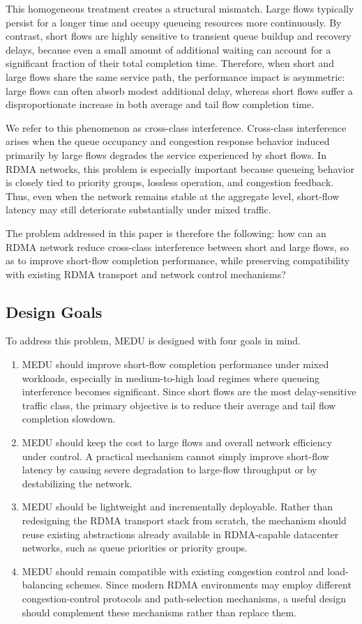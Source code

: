 \documentclass[conference]{IEEEtran}
\begin{document}
This homogeneous treatment creates a structural mismatch. Large flows typically persist for a longer time and occupy queueing resources more continuously. By contrast, short flows are highly sensitive to transient queue buildup and recovery delays, because even a small amount of additional waiting can account for a significant fraction of their total completion time. Therefore, when short and large flows share the same service path, the performance impact is asymmetric: large flows can often absorb modest additional delay, whereas short flows suffer a disproportionate increase in both average and tail flow completion time.

We refer to this phenomenon as cross-class interference. Cross-class interference arises when the queue occupancy and congestion response behavior induced primarily by large flows degrades the service experienced by short flows. In RDMA networks, this problem is especially important because queueing behavior is closely tied to priority groups, lossless operation, and congestion feedback. Thus, even when the network remains stable at the aggregate level, short-flow latency may still deteriorate substantially under mixed traffic.

The problem addressed in this paper is therefore the following: how can an RDMA network reduce cross-class interference between short and large flows, so as to improve short-flow completion performance, while preserving compatibility with existing RDMA transport and network control mechanisms?

\subsection{Design Goals}

To address this problem, MEDU is designed with four goals in mind.

\begin{enumerate}
  \item MEDU should improve short-flow completion performance under mixed workloads, especially in medium-to-high load regimes where queueing interference becomes significant. Since short flows are the most delay-sensitive traffic class, the primary objective is to reduce their average and tail flow completion slowdown.
  \item MEDU should keep the cost to large flows and overall network efficiency under control. A practical mechanism cannot simply improve short-flow latency by causing severe degradation to large-flow throughput or by destabilizing the network.
  \item MEDU should be lightweight and incrementally deployable. Rather than redesigning the RDMA transport stack from scratch, the mechanism should reuse existing abstractions already available in RDMA-capable datacenter networks, such as queue priorities or priority groups.
  \item MEDU should remain compatible with existing congestion control and load-balancing schemes. Since modern RDMA environments may employ different congestion-control protocols and path-selection mechanisms, a useful design should complement these mechanisms rather than replace them.
\end{enumerate}
\end{document}
